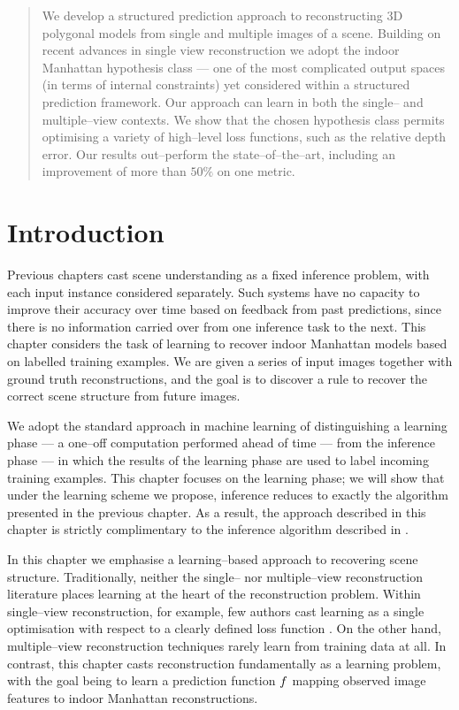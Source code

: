 \begin{quote}
  We develop a structured prediction approach to reconstructing 3D
  polygonal models from single and multiple images of a
  scene. Building on recent advances in single view reconstruction we
  adopt the indoor Manhattan hypothesis class --- one of the most
  complicated output spaces (in terms of internal constraints) yet
  considered within a structured prediction framework. Our approach
  can learn in both the single-- and multiple--view contexts. We
  show that the chosen hypothesis class permits optimising a variety
  of high--level loss functions, such as the relative depth error. Our
  results out--perform the state--of--the--art, including an
  improvement of more than $50\%$ on one metric.\footnotemark
\end{quote}


\section{Introduction}
\label{sec:introduction}

Previous chapters cast scene understanding as a fixed inference
problem, with each input instance considered separately. Such systems
have no capacity to improve their accuracy over time based on feedback
from past predictions, since there is no information carried over from
one inference task to the next. This chapter considers the task of
learning to recover indoor Manhattan models based on labelled training
examples. We are given a series of input images together with ground
truth reconstructions, and the goal is to discover a rule to recover
the correct scene structure from future images.

We adopt the standard approach in machine learning of distinguishing a
learning phase --- a one--off computation performed ahead of time ---
from the inference phase --- in which the results of the learning
phase are used to label incoming training examples. This chapter
focuses on the learning phase; we will show that under the learning
scheme we propose, inference reduces to exactly the algorithm
presented in the previous chapter. As a result, the approach described
in this chapter is strictly complimentary to the inference algorithm
described in .

In this chapter we emphasise a learning--based approach to recovering
scene structure. Traditionally, neither the single-- nor
multiple--view reconstruction literature places learning at the heart
of the reconstruction problem. Within single--view reconstruction, for
example, few authors cast learning as a single optimisation with
respect to a clearly defined loss function
\cite{Hoiem05,Saxena09,Lee09,Flint11}. On the other hand,
multiple--view reconstruction techniques rarely learn from training
data at all. In contrast, this chapter casts reconstruction
fundamentally as a learning problem, with the goal being to learn a
prediction function $\Predictor$ mapping observed image features to
indoor Manhattan reconstructions.

